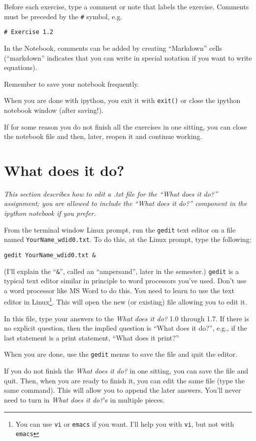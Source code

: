 \documentclass{article}
\begin{document}
\begin{spacing}{1.0}
Before each exercise, type a comment or note that labels the exercise.  
Comments must be preceded by the \verb|#| symbol, e.g.

\texttt{# Exercise 1.2}

In the Notebook, comments can be added by creating ``Markdown'' cells
(``markdown'' indicates that you can write in special notation if you want to
write equations).

Remember to save your notebook frequently.

When you are done with ipython, you exit it with \texttt{exit()} or close the
ipython notebook window (after saving!).

If for some reason you do not finish all the exercises in one sitting, you can
close the notebook file and then, later, reopen it and continue working. 


\section{\textbf{What does it do?} }
{\it This section describes how to edit a .txt file for the ``What does it do?'' 
assignment; you are allowed to include the ``What does it do?'' component in the
ipython notebook if you prefer.}

From the terminal window Linux prompt, run the \texttt{gedit} text editor on a
file named \texttt{YourName\_wdid0.txt}.  To do this, at the Linux prompt, type
the following:

\texttt{gedit YourName\_wdid0.txt \&}

(I’ll explain the “\texttt{\&}”, called an “ampersand”, later in the semester.)
\texttt{gedit} is a typical text editor similar in principle to word processors
you’ve used.  Don’t use a word processor like MS Word to do this.  You need to
learn to use the text editor in Linux\footnote{You can use \texttt{vi} or
\texttt{emacs} if you want.  I'll help you with \texttt{vi}, but not with
\texttt{emacs}}.   This will open the new (or existing)
file allowing you to edit it.  

In this file, type your answers to the \emph{What does it do?} 1.0 through 1.7.
If there is no explicit question, then the implied question is “What does it
do?”, e.g., if the last statement is a print statement, “What does it print?”

When you are done, use the \texttt{gedit} menus to save the file and quit the editor.

If you do not finish the \emph{What does it do?} in one sitting, you can save
the file and quit.  Then, when you are ready to finish it, you can edit the
same file (type the same command).  This will allow you to append the later
answers.  You’ll never need to turn in \emph{What does it do?}’s in multiple
pieces.



\end{spacing}
\end{document}
